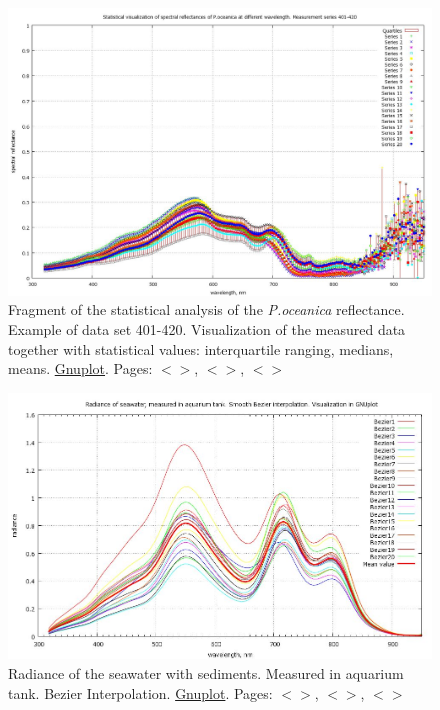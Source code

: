 \documentclass[11pt]{article}
\begin{document}
\begin{appendices}
\begin{figure}[H]
	\begin{center}
	\includegraphics[scale=0.27]{GNU-Stat-M-401-420.jpg}
	\caption{Fragment of the statistical analysis of the \textit{P.oceanica} reflectance. Example of data set 401-420. 
		Visualization of the measured data together with statistical values: interquartile ranging, medians, means. \href{http://www.gnuplot.info/}{Gnuplot}. Pages: $<$\pageref{page-21}$>$, $<$\pageref{dataprep}$>$, $<$\pageref{page-30}$>$}
	\label{fig:A.15}
	\end{center}
\end{figure}

\begin{figure}[H]
	\centering
	\includegraphics[scale=0.35]{GNU-Radiance_Bezier.jpg}
	\caption{Radiance of the seawater with sediments. Measured in aquarium tank. Bezier Interpolation. \href{http://www.gnuplot.info/}{Gnuplot}. Pages: $<$\pageref{dataprep}$>$, $<$\pageref{page-40}$>$, $<$\pageref{page-30}$>$}
	\label{fig:A.16}
\end{figure}


\end{appendices}
\end{document}
